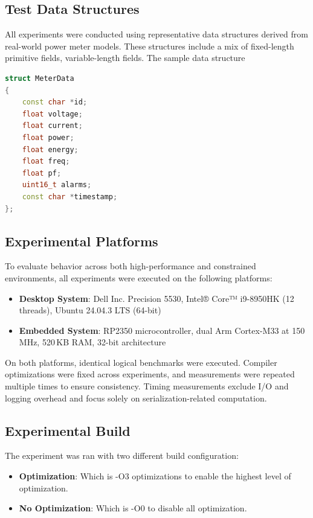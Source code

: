 \documentclass[11pt, a4paper]{article}
\begin{document}
\subsection{Test Data Structures}

All experiments were conducted using representative data structures derived from real-world power meter models. These structures include a mix of fixed-length primitive fields, variable-length fields.
The sample data structure
\begin{lstlisting}[language=c++, caption={Test Data structure},  breaklines=true,
  breakatwhitespace=false,
  columns=fullflexible]
struct MeterData
{
    const char *id;
    float voltage;
    float current;
    float power;
    float energy;
    float freq;
    float pf;
    uint16_t alarms;
    const char *timestamp;
};
\end{lstlisting}
\subsection{Experimental Platforms}

To evaluate behavior across both high-performance and constrained environments, all experiments were executed on the following platforms:

\begin{itemize}
    \item \textbf{Desktop System}:
          Dell Inc. Precision 5530, Intel® Core™ i9-8950HK (12 threads), Ubuntu 24.04.3 LTS (64-bit)

    \item \textbf{Embedded System}:
          RP2350 microcontroller, dual Arm Cortex-M33 at 150\,MHz, 520\,KB RAM, 32-bit architecture
\end{itemize}

On both platforms, identical logical benchmarks were executed. Compiler optimizations were fixed across experiments, and measurements were repeated multiple times to ensure consistency. Timing measurements exclude I/O and logging overhead and focus solely on serialization-related computation.

\subsection{Experimental Build}
The experiment was ran with two different build configuration:
\begin{itemize}
    \item \textbf{Optimization}: Which is -O3 optimizations to enable the highest level of optimization.
    \item \textbf{No Optimization}: Which is -O0 to disable all optimization.
\end{itemize}
\end{document}
